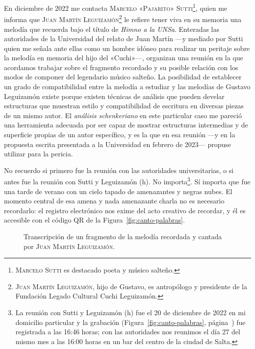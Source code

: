 En diciembre de 2022 me contacta \textsc{Marcelo «Pajarito» Sutti}\footnote{\textsc{Marcelo Sutti} es destacado poeta y músico salteño.}, quien me informa que \textsc{Juan Martín Leguizamón}\footnote{\textsc{Juan Martín Leguizamón}, hijo de Gustavo, es antropólogo y presidente de la Fundación Legado Cultural Cuchi Leguizamón.} le refiere tener viva en su memoria una melodía que recuerda bajo el título de \emph{Himno a la UNSa}. Enteradas las autoridades de la Universidad del relato de Juan Martín ---y mediado por Sutti quien me señala ante ellas como un hombre idóneo para realizar un peritaje sobre la melodía en memoria del hijo del «Cuchi»---, organizan una reunión en la que acordamos trabajar sobre el fragmento recordado y su posible relación con los modos de componer del legendario músico salteño. La posibilidad de establecer un grado de compatibilidad entre la melodía a estudiar y las melodías de Gustavo Leguizamón existe porque existen técnicas de análisis que pueden develar estructuras que muestran estilo y compatibilidad de escritura en diversas piezas de un mismo autor. El \emph{análisis schenkeriano} en este particular caso me pareció una herramienta adecuada por ser capaz de mostrar estructuras intermedias y de superficie propias de un autor específico, y es la que en esa reunión ---y en la propuesta escrita presentada a la Universidad en febrero de 2023--- propuse utilizar para la pericia.

No recuerdo si primero fue la reunión con las autoridades universitarias, o si antes fue la reunión con Sutti y Leguizamón (h). No importa\footnote{La reunión con Sutti y Leguizamón (h) fue el 20 de diciembre de 2022 en mi domicilio particular y la grabación (Figura~\ref{fig:canto-palabras}, página~\pageref{fig:canto-palabras}) fue registrada a las 16:46 horas; con las autoridades nos reunimos el día 27 del mismo mes a las 16:00 horas en un bar del centro de la ciudad de Salta.}. Sí importa que fue una tarde de verano con un cielo tapado de amenazantes y negras nubes. El momento central de esa amena y nada amenazante charla no es necesario recordarlo: el registro electrónico nos exime del acto creativo de recordar, y él es accesible con el código QR de la Figura~\ref{fig:canto-palabras}.

\begin{figure}[htb]
\caption[Transcripción de un fragmento de la melodía recordada.]{Transcripción de un fragmento de la melodía recordada y cantada por \textsc{Juan Martín Leguizamón.}}
\label{fig:Transcripcion}
\end{figure}

